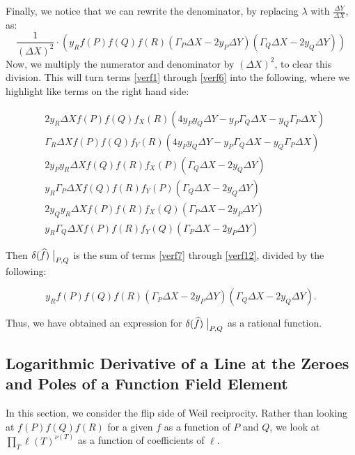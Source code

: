 \documentclass[11pt,letterpaper]{article}
\theoremstyle{definition}
\newcommand{\6}{\mathbf}
\newcommand{\7}{\mathcal}
\newcommand{\non}{2 y_R \Delta X f(P)f(Q)f_X(R)(4 y_P y_Q  \Delta Y - y_P  \Gamma_Q \Delta X  - y_Q  \Gamma_P \Delta X )}
\newcommand{\ntw}{\Gamma_R \Delta X f(P)f(Q)f_Y(R)(4 y_P y_Q \Delta Y - y_P \Gamma_Q \Delta X  - y_Q \Gamma_P \Delta X )}
\newcommand{\nth}{2 y_P y_R \Delta X f(Q)f(R)f_X(P)(\Gamma_Q \Delta X - 2 y_Q \Delta Y)}
\newcommand{\nfo}{y_R \Gamma_P \Delta X f(Q)f(R)f_Y(P)(\Gamma_Q \Delta X  - 2  y_Q \Delta Y)}
\newcommand{\nfi}{2 y_Q y_R \Delta X  f(P)f(R)f_X(Q)(\Gamma_P \Delta X - 2 y_P \Delta Y) }
\newcommand{\nsi}{y_R \Gamma_Q \Delta X f(P)f(R)f_Y(Q)(\Gamma_P  \Delta X - 2  y_P \Delta Y) }
\begin{document}
Finally, we notice that we can rewrite the denominator, by replacing $\lambda$ with $\frac{\Delta Y}{\Delta X}$, as:
$$\frac{1}{(\Delta X)^2} \cdot (y_R f(P)f(Q)f(R)(\Gamma_P\Delta X - 2 y_P \Delta Y)(\Gamma_Q\Delta X - 2 y_Q \Delta Y))$$
Now, we multiply the numerator and denominator by $(\Delta X)^2$, to clear this division. This will turn terms \ref{verf1} through \ref{verf6} into the following, where we highlight like terms on the right hand side:



\begin{align}
 & \non \label{verf7} \\
 & \ntw \label{verf8} \\
 & \nth \label{verf9} \\
 & \nfo \label{verf10} \\
 & \nfi \label{verf11} \\
 & \nsi \label{verf12}
\end{align}

Then $\delta(\widehat{f}) \bigm\vert_{P,Q}$ is the sum of terms \ref{verf7} through \ref{verf12}, divided by the following:

$$y_R f(P)f(Q)f(R)(\Gamma_P\Delta X - 2 y_P \Delta Y)(\Gamma_Q\Delta X - 2 y_Q \Delta Y).$$

Thus, we have obtained an expression for $\delta(\widehat{f}) \bigm\vert_{P,Q}$ as a rational function.




\subsection{Logarithmic Derivative of a Line at the Zeroes and Poles of a Function Field Element}

In this section, we consider the flip side of Weil reciprocity. Rather than looking at $f(P)f(Q)f(R)$ for a given $f$ as a function of $P$ and $Q$, we look at $\prod_T \ell(T)^{\nu(T)}$ as a function of coefficients of $\ell$.
\end{document}
